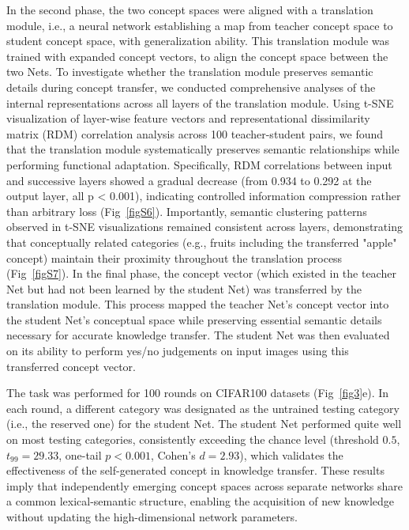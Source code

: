 \documentclass[pdflatex,sn-mathphys-num,lineno]{sn-jnl}%
\begin{document}
\begin{CJK}{UTF8}{gbsn}
In the second phase, the two concept spaces were aligned with a translation module, i.e., a neural network establishing a map from teacher concept space to student concept space, with generalization ability. This translation module was trained with expanded concept vectors, to align the concept space between the two Nets. To investigate whether the translation module preserves semantic details during concept transfer, we conducted comprehensive analyses of the internal representations across all layers of the translation module. Using t-SNE visualization of layer-wise feature vectors and representational dissimilarity matrix (RDM) correlation analysis across 100 teacher-student pairs, we found that the translation module systematically preserves semantic relationships while performing functional adaptation. Specifically, RDM correlations between input and successive layers showed a gradual decrease (from 0.934 to 0.292 at the output layer, all p < 0.001), indicating controlled information compression rather than arbitrary loss (Fig~\ref{figS6}). Importantly, semantic clustering patterns observed in t-SNE visualizations remained consistent across layers, demonstrating that conceptually related categories (e.g., fruits including the transferred "apple" concept) maintain their proximity throughout the translation process (Fig~\ref{figS7}). In the final phase, the concept vector (which existed in the teacher Net but had not been learned by the student Net) was transferred by the translation module. This process mapped the teacher Net's concept vector into the student Net's conceptual space while preserving essential semantic details necessary for accurate knowledge transfer. The student Net was then evaluated on its ability to perform yes/no judgements on input images using this transferred concept vector.

The task was performed for 100 rounds on CIFAR100 datasets (Fig~\ref{fig3}e). In each round, a different category was designated as the untrained testing category (i.e., the reserved one) for the student Net. The student Net performed quite well on most testing categories, consistently exceeding the chance level (threshold $0.5$, $t_{99}=29.33$, one-tail $p < 0.001$, Cohen's $d=2.93$), which validates the effectiveness of the self-generated concept in knowledge transfer. These results imply that independently emerging concept spaces across separate networks share a common lexical-semantic structure, enabling the acquisition of new knowledge without updating the high-dimensional network parameters.


\end{CJK}
\end{document}
